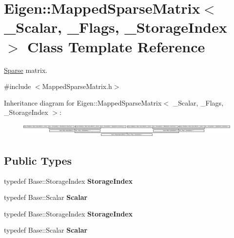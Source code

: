 \hypertarget{class_eigen_1_1_mapped_sparse_matrix}{}\section{Eigen\+:\+:Mapped\+Sparse\+Matrix$<$ \+\_\+\+Scalar, \+\_\+\+Flags, \+\_\+\+Storage\+Index $>$ Class Template Reference}
\label{class_eigen_1_1_mapped_sparse_matrix}


\hyperlink{struct_eigen_1_1_sparse}{Sparse} matrix.  




{\ttfamily \#include $<$Mapped\+Sparse\+Matrix.\+h$>$}

Inheritance diagram for Eigen\+:\+:Mapped\+Sparse\+Matrix$<$ \+\_\+\+Scalar, \+\_\+\+Flags, \+\_\+\+Storage\+Index $>$\+:\begin{figure}[H]
\begin{center}
\leavevmode
\includegraphics[height=0.687398cm]{class_eigen_1_1_mapped_sparse_matrix}
\end{center}
\end{figure}
\subsection*{Public Types}
\begin{DoxyCompactItemize}
\item 
\mbox{\label{class_eigen_1_1_mapped_sparse_matrix_adf73cc50ae4835aa4db56740dffacbc2}} 
typedef Base\+::\+Storage\+Index {\bfseries Storage\+Index}
\item 
\mbox{\label{class_eigen_1_1_mapped_sparse_matrix_a70e97a4e9933f2d92b30a24f0b8fe02a}} 
typedef Base\+::\+Scalar {\bfseries Scalar}
\item 
\mbox{\label{class_eigen_1_1_mapped_sparse_matrix_adf73cc50ae4835aa4db56740dffacbc2}} 
typedef Base\+::\+Storage\+Index {\bfseries Storage\+Index}
\item 
\mbox{\label{class_eigen_1_1_mapped_sparse_matrix_a70e97a4e9933f2d92b30a24f0b8fe02a}} 
typedef Base\+::\+Scalar {\bfseries Scalar}
\end{DoxyCompactItemize}
